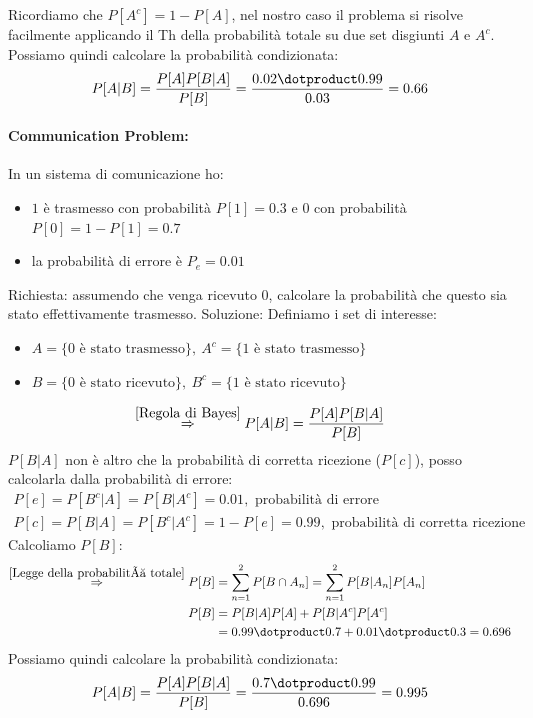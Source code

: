                 Ricordiamo che $P[A^c] = 1-P[A]$, nel nostro caso il problema si risolve facilmente applicando il Th della probabilità totale su due set disgiunti 
                $A$ e $A^c$. Possiamo quindi calcolare la probabilità condizionata:
                \[
                    P[A|B] = \frac{P[A]P[B|A]}{P[B]} = \frac{0.02 \dotproduct 0.99}{0.03} = 0.66    
                \]

            \paragraph{Communication Problem:} In un sistema di comunicazione ho:
                \begin{itemize}
                    \item {$1$ è trasmesso con probabilità $P[1] = 0.3$ e $0$ con probabilità $P[0] = 1-P[1] = 0.7$}
                    \item {la probabilità di errore è $P_e = 0.01$}
                \end{itemize}
                Richiesta: assumendo che venga ricevuto $0$, calcolare la probabilità che questo sia stato effettivamente trasmesso.
                Soluzione: Definiamo i set di interesse:
                \begin{itemize}
                    \item {$A = \{0\text{ è stato trasmesso}\},\ A^c = \{1 \text{ è stato trasmesso}\}$}
                    \item {$B = \{0\text{ è stato ricevuto}\},\ B^c = \{1 \text{ è stato ricevuto}\}$}
                \end{itemize}
                \[
                    \overset{\ref{Regola di Bayes}}{\Rightarrow} P[A|B] = \frac{P[A]P[B|A]}{P[B]}    
                \]                           
                $P[B|A]$ non è altro che la probabilità di corretta ricezione ($P[c]$), posso calcolarla dalla probabilità di errore:
                \begin{gather}
                    P[e] = P[B^c|A] = P[B|A^c] = 0.01, \text{ probabilità di errore} \nonumber \\
                    P[c] = P[B|A] = P[B^c|A^c] = 1-P[e]= 0.99, \text{ probabilità di corretta ricezione}\nonumber 
                \end{gather}
                Calcoliamo $P[B]$:
                \begin{align}
                    \overset{\ref{Legge della probabilità totale}}{\Rightarrow} P[B] &= \sum_{n=1}^{2} P[B\cap A_n] = \sum_{n=1}^{2} P[B|A_n] P[A_n] \nonumber \\
                    P[B] &= P[B|A]P[A] + P[B|A^c]P[A^c] \nonumber \\
                         &= 0.99\dotproduct 0.7 + 0.01 \dotproduct 0.3 = 0.696 \nonumber       
                \end{align}
                Possiamo quindi calcolare la probabilità condizionata:
                \[
                    P[A|B] = \frac{P[A]P[B|A]}{P[B]} = \frac{0.7 \dotproduct 0.99}{0.696} = 0.995    
                \]
